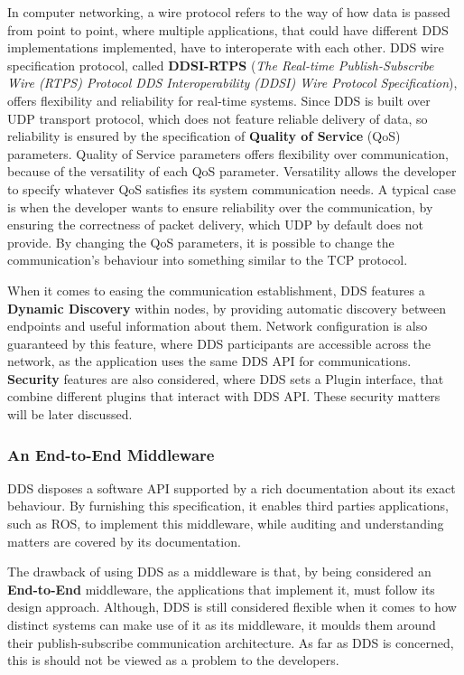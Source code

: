 In computer networking, a wire protocol refers to the way of how data is passed from point to point, where multiple applications, that could have different DDS implementations implemented, have to interoperate with each other. DDS wire specification protocol, called \textbf{DDSI-RTPS} (\textit{The Real-time Publish-Subscribe Wire (RTPS) Protocol DDS Interoperability (DDSI) Wire Protocol Specification}), offers flexibility and reliability for real-time systems. Since DDS is built over UDP transport protocol, which does not feature reliable delivery of data, so reliability is ensured by the specification of \textbf{Quality of Service} (QoS) parameters. Quality of Service parameters offers flexibility over communication, because of the versatility of each QoS parameter. Versatility allows the developer to specify whatever QoS satisfies its system communication needs. A typical case is when the developer wants to ensure reliability over the communication, by ensuring the correctness of packet delivery, which UDP by default does not provide. By changing the QoS parameters, it is possible to change the communication's behaviour into something similar to the TCP protocol.  

When it comes to easing the communication establishment, DDS features a \textbf{Dynamic Discovery} within nodes, by providing automatic discovery between endpoints and useful information about them. Network configuration is also guaranteed by this feature, where DDS participants are accessible across the network, as the application uses the same DDS API for communications. \textbf{Security} features are also considered, where DDS sets a Plugin interface, that combine different plugins that interact with DDS API. These security matters will be later discussed.

\subsubsection{An End-to-End Middleware}

DDS disposes a software API supported by a rich documentation about its exact behaviour. By furnishing this specification, it enables third parties applications, such as ROS, to implement this middleware, while auditing and understanding matters are covered by its documentation.

The drawback of using DDS as a middleware is that, by being considered an \textbf{End-to-End} middleware, the applications that implement it, must follow its design approach. Although, DDS is still considered flexible when it comes to how distinct systems can make use of it as its middleware, it moulds them around their publish-subscribe communication architecture. As far as DDS is concerned, this is should not be viewed as a problem to the developers.

